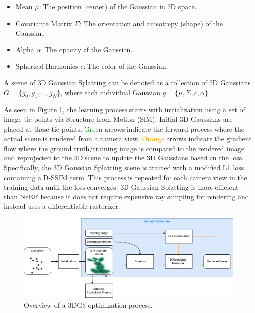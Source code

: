 \begin{itemize}[noitemsep]
    \item Mean $\mu$: The position (center) of the Gaussian in 3D space.
    \item Covariance Matrix $\Sigma$: The orientation and anisotropy (shape) of the Gaussian.
    \item Alpha $ \alpha$: The opacity of the Gaussian.
    \item Spherical Harmonics $c$: The color of the Gaussian.
\end{itemize}

A scene of 3D Gaussian Splatting can be denoted as a collection of 3D Gaussians $G = \{g_0, g_1, \dots ,g_N\}$, where each individual Gaussian $g = \{\mu , \Sigma , c, \alpha \}$.

As seen in Figure \ref{fig:3D_Gaussian_Splatting}, the learning process starts with initialization using a set of image tie points via Structure from Motion (SfM). Initial 3D Gaussians are placed at these tie points. \textcolor{green}{Green} arrows indicate the forward process where the actual scene is rendered from a camera view. \textcolor{orange}{Orange} arrows indicate the gradient flow where the ground truth/training image is compared to the rendered image and reprojected to the 3D scene to update the 3D Gaussians based on the loss. Specifically, the 3D Gaussian Splatting scene is trained with a modified L1 loss containing a D-SSIM \citep{Baker.2023} term. This process is repeated for each camera view in the training data until the loss converges. 3D Gaussian Splatting is more efficient than NeRF because it does not require expensive ray sampling for rendering and instead uses a differentiable rasterizer.

\begin{figure}
    \centering
    \includegraphics[width=\textwidth]{Figures/prelim_related/3D_gaussian_workflow.png}
    \caption{Overview of a 3DGS optimization process.}
    \label{fig:3D_Gaussian_Splatting}
\end{figure}

